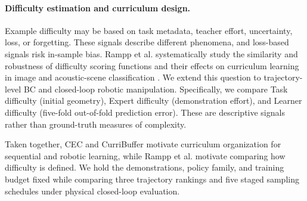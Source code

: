 \paragraph{Difficulty estimation and curriculum design.}
Example difficulty may be based on task metadata, teacher effort, uncertainty,
loss, or forgetting. These signals describe different phenomena, and
loss-based signals risk in-sample bias. Rampp et al. systematically study the
similarity and robustness of difficulty scoring functions and their effects on
curriculum learning in image and acoustic-scene classification
\citep{rampp2024difficulty}. We extend this question to trajectory-level BC and
closed-loop robotic manipulation. Specifically, we compare Task difficulty
(initial geometry), Expert difficulty (demonstration effort), and Learner
difficulty (five-fold out-of-fold prediction error). These are descriptive
signals rather than ground-truth measures of complexity.

Taken together, CEC and CurriBuffer motivate curriculum organization for
sequential and robotic learning, while Rampp et al. motivate comparing how
difficulty is defined. We hold the demonstrations, policy family, and training
budget fixed while comparing three trajectory rankings and five staged
sampling schedules under physical closed-loop evaluation.
